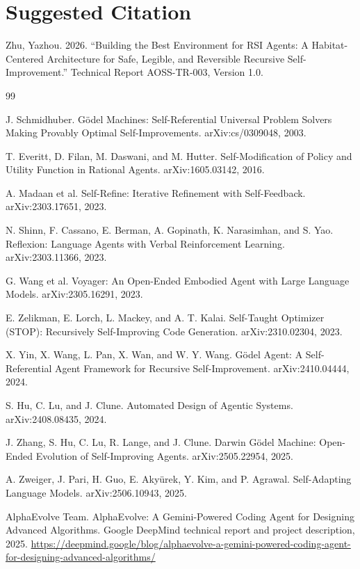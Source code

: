 \documentclass[11pt,a4paper]{article}
\begin{document}
\section*{Suggested Citation}

Zhu, Yazhou. 2026. ``Building the Best Environment for RSI Agents: A Habitat-Centered Architecture for Safe, Legible, and Reversible Recursive Self-Improvement.'' Technical Report AOSS-TR-003, Version 1.0.

\begin{thebibliography}{99}\small

J. Schmidhuber. G\"odel Machines: Self-Referential Universal Problem Solvers Making Provably Optimal Self-Improvements. arXiv:cs/0309048, 2003.

T. Everitt, D. Filan, M. Daswani, and M. Hutter. Self-Modification of Policy and Utility Function in Rational Agents. arXiv:1605.03142, 2016.

A. Madaan et al. Self-Refine: Iterative Refinement with Self-Feedback. arXiv:2303.17651, 2023.

N. Shinn, F. Cassano, E. Berman, A. Gopinath, K. Narasimhan, and S. Yao. Reflexion: Language Agents with Verbal Reinforcement Learning. arXiv:2303.11366, 2023.

G. Wang et al. Voyager: An Open-Ended Embodied Agent with Large Language Models. arXiv:2305.16291, 2023.

E. Zelikman, E. Lorch, L. Mackey, and A. T. Kalai. Self-Taught Optimizer (STOP): Recursively Self-Improving Code Generation. arXiv:2310.02304, 2023.

X. Yin, X. Wang, L. Pan, X. Wan, and W. Y. Wang. G\"odel Agent: A Self-Referential Agent Framework for Recursive Self-Improvement. arXiv:2410.04444, 2024.

S. Hu, C. Lu, and J. Clune. Automated Design of Agentic Systems. arXiv:2408.08435, 2024.

J. Zhang, S. Hu, C. Lu, R. Lange, and J. Clune. Darwin G\"odel Machine: Open-Ended Evolution of Self-Improving Agents. arXiv:2505.22954, 2025.

A. Zweiger, J. Pari, H. Guo, E. Aky\"urek, Y. Kim, and P. Agrawal. Self-Adapting Language Models. arXiv:2506.10943, 2025.

AlphaEvolve Team. AlphaEvolve: A Gemini-Powered Coding Agent for Designing Advanced Algorithms. Google DeepMind technical report and project description, 2025. \url{https://deepmind.google/blog/alphaevolve-a-gemini-powered-coding-agent-for-designing-advanced-algorithms/}


\end{thebibliography}
\end{document}
